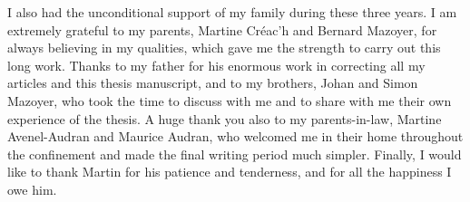 I also had the unconditional support of my family during these three years. I am extremely grateful to my parents, Martine Créac'h and Bernard Mazoyer, for always believing in my qualities, which gave me the strength to carry out this long work. Thanks to my father for his enormous work in correcting all my articles and this thesis manuscript, and to my brothers, Johan and Simon Mazoyer, who took the time to discuss with me and to share with me their own experience of the thesis. A huge thank you also to my parents-in-law, Martine Avenel-Audran and Maurice Audran, who welcomed me in their home throughout the confinement and made the final writing period much simpler. Finally, I would like to thank Martin for his patience and tenderness, and for all the happiness I owe him.
